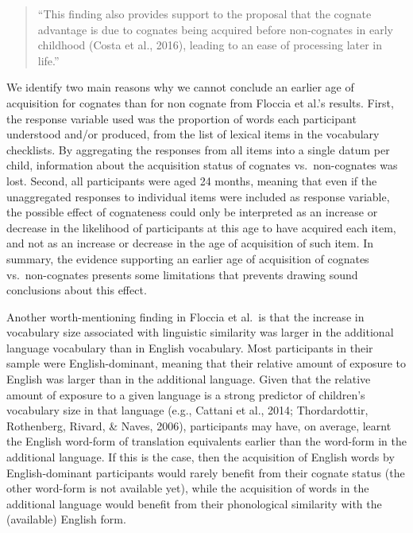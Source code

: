 \documentclass[
  english,
  man,man,floatsintext]{apa6}
\begin{document}
\begin{quote}
``This finding also provides support to the proposal that the cognate advantage is due to cognates being acquired before non-cognates in early childhood (Costa et al., 2016), leading to an ease of processing later in life.''
\end{quote}

We identify two main reasons why we cannot conclude an earlier age of acquisition for cognates than for non cognate from Floccia et al.'s results. First, the response variable used was the proportion of words each participant understood and/or produced, from the list of lexical items in the vocabulary checklists. By aggregating the responses from all items into a single datum per child, information about the acquisition status of cognates vs.~non-cognates was lost. Second, all participants were aged 24 months, meaning that even if the unaggregated responses to individual items were included as response variable, the possible effect of cognateness could only be interpreted as an increase or decrease in the likelihood of participants at this age to have acquired each item, and not as an increase or decrease in the age of acquisition of such item. In summary, the evidence supporting an earlier age of acquisition of cognates vs.~non-cognates presents some limitations that prevents drawing sound conclusions about this effect.

Another worth-mentioning finding in Floccia et al.~is that the increase in vocabulary size associated with linguistic similarity was larger in the additional language vocabulary than in English vocabulary. Most participants in their sample were English-dominant, meaning that their relative amount of exposure to English was larger than in the additional language. Given that the relative amount of exposure to a given language is a strong predictor of children's vocabulary size in that language (e.g., Cattani et al., 2014; Thordardottir, Rothenberg, Rivard, \& Naves, 2006), participants may have, on average, learnt the English word-form of translation equivalents earlier than the word-form in the additional language. If this is the case, then the acquisition of English words by English-dominant participants would rarely benefit from their cognate status (the other word-form is not available yet), while the acquisition of words in the additional language would benefit from their phonological similarity with the (available) English form.
\end{document}
